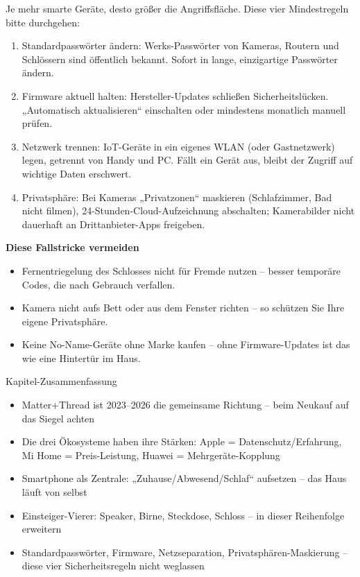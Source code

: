 
Je mehr smarte Geräte, desto größer die Angriffsfläche. Diese vier Mindestregeln bitte durchgehen:

\begin{enumerate}
  \item Standardpasswörter ändern: Werks-Passwörter von Kameras, Routern und Schlössern sind öffentlich bekannt. Sofort in lange, einzigartige Passwörter ändern.
  \item Firmware aktuell halten: Hersteller-Updates schließen Sicherheitslücken. „Automatisch aktualisieren“ einschalten oder mindestens monatlich manuell prüfen.
  \item Netzwerk trennen: IoT-Geräte in ein eigenes WLAN (oder Gastnetzwerk) legen, getrennt von Handy und PC. Fällt ein Gerät aus, bleibt der Zugriff auf wichtige Daten erschwert.
  \item Privatsphäre: Bei Kameras „Privatzonen“ maskieren (Schlafzimmer, Bad nicht filmen), 24-Stunden-Cloud-Aufzeichnung abschalten; Kamerabilder nicht dauerhaft an Drittanbieter-Apps freigeben.
\end{enumerate}

\textbf{Diese Fallstricke vermeiden}\par

\begin{itemize}
  \item Fernentriegelung des Schlosses nicht für Fremde nutzen – besser temporäre Codes, die nach Gebrauch verfallen.
  \item Kamera nicht aufs Bett oder aus dem Fenster richten – so schützen Sie Ihre eigene Privatsphäre.
  \item Keine No-Name-Geräte ohne Marke kaufen – ohne Firmware-Updates ist das wie eine Hintertür im Haus.
\end{itemize}

\begin{tcbsummary}{Kapitel-Zusammenfassung}
\begin{itemize}
  \item Matter+Thread ist 2023–2026 die gemeinsame Richtung – beim Neukauf auf das Siegel achten
  \item Die drei Ökosysteme haben ihre Stärken: Apple = Datenschutz/Erfahrung, Mi Home = Preis-Leistung, Huawei = Mehrgeräte-Kopplung
  \item Smartphone als Zentrale: „Zuhause/Abwesend/Schlaf“ aufsetzen – das Haus läuft von selbst
  \item Einsteiger-Vierer: Speaker, Birne, Steckdose, Schloss – in dieser Reihenfolge erweitern
  \item Standardpasswörter, Firmware, Netzseparation, Privatsphären-Maskierung – diese vier Sicherheitsregeln nicht weglassen
\end{itemize}

\end{tcbsummary}
